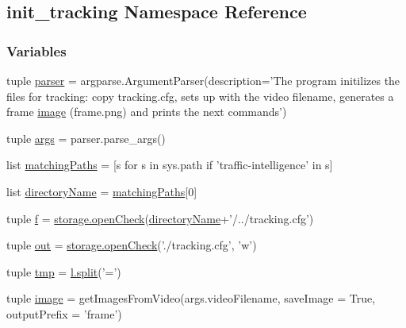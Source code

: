 \hypertarget{namespaceinit__tracking}{\subsection{init\-\_\-tracking Namespace Reference}
\label{namespaceinit__tracking}
}
\subsubsection*{Variables}
\begin{DoxyCompactItemize}
\item 
tuple \hyperlink{namespaceinit__tracking_ac2534cae722aec75c084be09061968fa}{parser} = argparse.\-Argument\-Parser(description='The program initilizes the files for tracking\-: copy tracking.\-cfg, sets up with the video filename, generates a frame \hyperlink{namespaceinit__tracking_a57bdd1f19f963cb83e6216cc27142c84}{image} (frame.\-png) and prints the next commands')
\item 
tuple \hyperlink{namespaceinit__tracking_a4f6d6b812ef6af92cf5547cd3bb9e7c1}{args} = parser.\-parse\-\_\-args()
\item 
list \hyperlink{namespaceinit__tracking_a9e5429abd9b30feafa3ffbd4a44da45d}{matching\-Paths} = \mbox{[}s for s in sys.\-path if 'traffic-\/intelligence' in s\mbox{]}
\item 
list \hyperlink{namespaceinit__tracking_a8ca67cf7fc266b8664e0e0616ca29397}{directory\-Name} = \hyperlink{namespaceinit__tracking_a9e5429abd9b30feafa3ffbd4a44da45d}{matching\-Paths}\mbox{[}0\mbox{]}
\item 
tuple \hyperlink{namespaceinit__tracking_a34c52058a9dcd8c6482f796437d0c14d}{f} = \hyperlink{namespacestorage_ad83a9b3ef476a0684e7cc4875a77f040}{storage.\-open\-Check}(\hyperlink{namespaceinit__tracking_a8ca67cf7fc266b8664e0e0616ca29397}{directory\-Name}+'/../tracking.\-cfg')
\item 
tuple \hyperlink{namespaceinit__tracking_a0f36ed6d4d6db2e74f3f852258832986}{out} = \hyperlink{namespacestorage_ad83a9b3ef476a0684e7cc4875a77f040}{storage.\-open\-Check}('./tracking.\-cfg', 'w')
\item 
tuple \hyperlink{namespaceinit__tracking_a02b68abd5880659ccbe3dde1479ada98}{tmp} = \hyperlink{utils_8hpp_a59bef446cafa212bf03dca6fb59c207d}{l.\-split}('=')
\item 
tuple \hyperlink{namespaceinit__tracking_a57bdd1f19f963cb83e6216cc27142c84}{image} = get\-Images\-From\-Video(args.\-video\-Filename, save\-Image = True, output\-Prefix = 'frame')
\end{DoxyCompactItemize}


